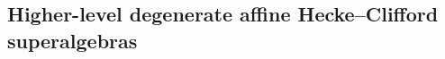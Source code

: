 \documentclass[11pt]{amsart}
\newtheorem{prop}[theo]{Proposition}
\theoremstyle{definition}
\numberwithin{equation}{section}
\begin{document}
%





\subsection{Higher-level degenerate affine Hecke--Clifford superalgebras}
\end{document}
